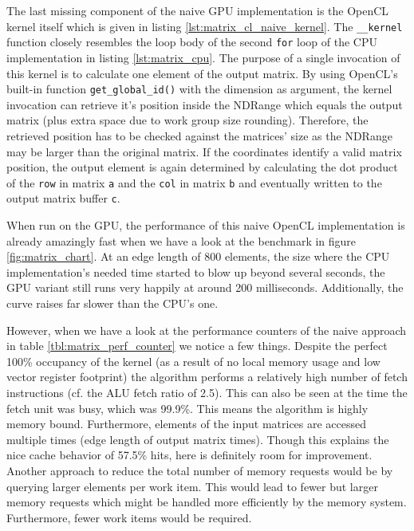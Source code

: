 

The last missing component of the naive GPU implementation is the OpenCL kernel itself which is given in listing \ref{lst:matrix_cl_naive_kernel}. The \lstinline!__kernel! function closely resembles the loop body of the second \lstinline!for! loop of the CPU implementation in listing \ref{lst:matrix_cpu}. The purpose of a single invocation of this kernel is to calculate one element of the output matrix. By using OpenCL's built-in function \lstinline!get_global_id()! with the dimension as argument, the kernel invocation can retrieve it's position inside the NDRange which equals the output matrix (plus extra space due to work group size rounding). Therefore, the retrieved position has to be checked against the matrices' size as the NDRange may be larger than the original matrix. If the coordinates identify a valid matrix position, the output element is again determined by calculating the dot product of the \lstinline!row! in matrix \lstinline!a! and the \lstinline!col! in matrix \lstinline!b! and eventually written to the output matrix buffer \lstinline!c!.



When run on the GPU, the performance of this naive OpenCL implementation is already amazingly fast when we have a look at the benchmark in figure \ref{fig:matrix_chart}. At an edge length of 800 elements, the size where the CPU implementation's needed time started to blow up beyond several seconds, the GPU variant still runs very happily at around 200 milliseconds. Additionally, the curve raises far slower than the CPU's one.

However, when we have a look at the performance counters of the naive approach in table \ref{tbl:matrix_perf_counter} we notice a few things. Despite the perfect 100\% occupancy of the kernel (as a result of no local memory usage and low vector register footprint) the algorithm performs a relatively high number of fetch instructions (cf. the ALU fetch ratio of 2.5). This can also be seen at the time the fetch unit was busy, which was 99.9\%. This means the algorithm is highly memory bound. Furthermore, elements of the input matrices are accessed multiple times (edge length of output matrix times). Though this explains the nice cache behavior of 57.5\% hits, here is definitely room for improvement.
Another approach to reduce the total number of memory requests would be by querying larger elements per work item. This would lead to fewer but larger memory requests which might be handled more efficiently by the memory system. Furthermore, fewer work items would be required.

